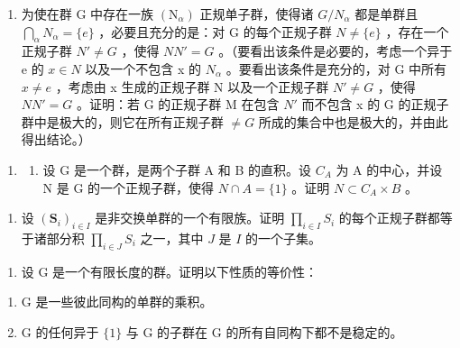 \begin{enumerate}
\def\labelenumi{(\alph{enumi})}
\setcounter{enumi}{1}
\tightlist
\item
  为使在群 G 中存在一族 \((\mathrm{N}_{\alpha})\) 正规单子群，使得诸 \(G/N_{\alpha}\) 都是单群且 \(\bigcap_{\alpha} N_{\alpha} = \{e\}\) ，必要且充分的是：对 G 的每个正规子群 \(N \neq \{e\}\) ，存在一个正规子群 \(N' \neq G\) ，使得 \(NN' = G\) 。（要看出该条件是必要的，考虑一个异于 e 的 \(x \in N\) 以及一个不包含 x 的 \(N_{\alpha}\) 。要看出该条件是充分的，对 G 中所有 \(x \neq e\) ，考虑由 x 生成的正规子群 N 以及一个正规子群 \(N' \neq G\) ，使得 \(NN' = G\) 。证明：若 G 的正规子群 M 在包含 \(N'\) 而不包含 x 的 G 的正规子群中是极大的，则它在所有正规子群 \(\neq G\) 所成的集合中也是极大的，并由此得出结论。）
\end{enumerate}

\begin{enumerate}
\def\labelenumi{\arabic{enumi}.}
\setcounter{enumi}{19}
\tightlist
\item
  \begin{enumerate}
  \def\labelenumii{(\alph{enumii})}
  \tightlist
  \item
  设 G 是一个群，是两个子群 A 和 B 的直积。设 \(C_{A}\) 为 A 的中心，并设 N 是 G 的一个正规子群，使得 \(N \cap A = \{1\}\) 。证明 \(N \subset C_{A} \times B\) 。
  \end{enumerate}
\end{enumerate}

\begin{enumerate}
\def\labelenumi{(\alph{enumi})}
\setcounter{enumi}{1}
\tightlist
\item
  设 \((\mathbf{S}_i)_{i\in I}\) 是非交换单群的一个有限族。证明 \(\prod_{i\in I}S_i\) 的每个正规子群都等于诸部分积 \(\prod_{i\in J}S_i\) 之一，其中 \(J\) 是 \(I\) 的一个子集。
\end{enumerate}

\begin{enumerate}
\def\labelenumi{\arabic{enumi}.}
\setcounter{enumi}{20}
\tightlist
\item
  设 G 是一个有限长度的群。证明以下性质的等价性：
\end{enumerate}

\begin{enumerate}
\def\labelenumi{(\alph{enumi})}
\item
  G 是一些彼此同构的单群的乘积。
\item
  G 的任何异于 \(\{1\}\) 与 G 的子群在 G 的所有自同构下都不是稳定的。
\end{enumerate}

